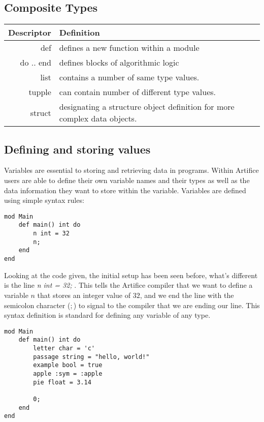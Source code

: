 \documentclass{article}
\begin{document}
\subsection{Composite Types}
\begin{center}
\begin{tabular}{|r|l|}
	\hline
	Descriptor & Definition \\
	\hline
	\hline
	def & defines a new function within a module \\
	do .. end & defines blocks of algorithmic logic \\
	list & contains a number of same type values. \\
	tupple & can contain number of different type values. \\
	struct & designating a structure object definition for more complex data objects. \\
	\hline
\end{tabular}
\end{center}

\subsection{Defining and storing values}

Variables are essential to storing and retrieving data in programs. Within Artifice users are able to define their own variable names and their types
as well as the data information they want to store within the variable. Variables are defined using simple syntax rules:

\begin{lstlisting}
mod Main
	def main() int do
		n int = 32
		n;
	end
end
\end{lstlisting}

Looking at the code given, the initial setup has been seen before, what's different is the line \textit{n int = 32;} . This tells the Artifice compiler that we want
to define a variable $n$ that stores an integer value of $32$, and we end the line with the semicolon character ($;$) to signal to the compiler that we are ending our
line. This syntax definition is standard for defining any variable of any type.

\begin{lstlisting}
mod Main
	def main() int do
		letter char = 'c'
		passage string = "hello, world!"
		example bool = true
		apple :sym = :apple
		pie float = 3.14

		0;
	end
end
\end{lstlisting}
\end{document}
